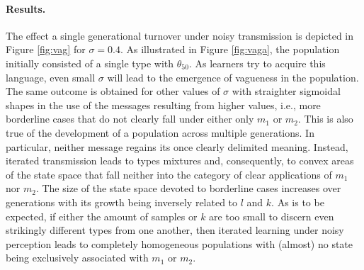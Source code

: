 \documentclass[10pt,a4paper]{article}
\begin{document}
\paragraph{Results.} The effect a single generational turnover under noisy transmission is depicted in Figure \ref{fig:vag} for $\sigma = 0.4$. As illustrated in Figure \ref{fig:vaga}, the population initially consisted of a single type with $\theta_{50}$. As learners try to acquire this language, even small $\sigma$ will lead to the emergence of vagueness in the population. The same outcome is obtained for other values of $\sigma$ with straighter sigmoidal shapes in the use of the messages resulting from higher values, i.e., more borderline cases that do not clearly fall under either only $m_1$ or $m_2$. This is also true of the development of a population across multiple generations. In particular, neither message regains its once clearly delimited meaning. Instead, iterated transmission leads to types mixtures and, consequently, to convex areas of the state space that fall neither into the category of clear applications of $m_1$ nor $m_2$. The size of the state space devoted to borderline cases increases over generations with its growth being inversely related to $l$ and $k$. As is to be expected, if either the amount of samples or $k$ are too small to discern even strikingly different types from one another, then iterated learning under noisy perception leads to completely homogeneous populations with (almost) no state being exclusively associated with $m_1$ or $m_2$.
\end{document}
